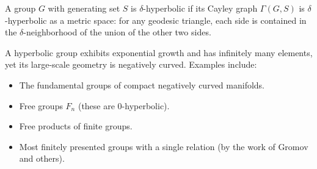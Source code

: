 A group $G$ with generating set $S$ is $\delta$-hyperbolic if its Cayley graph $\Gamma(G,S)$ is $\delta$-hyperbolic as a metric space: for any geodesic triangle, each side is contained in the $\delta$-neighborhood of the union of the other two sides.

A hyperbolic group exhibits exponential growth and has infinitely many elements, yet its large-scale geometry is negatively curved. Examples include:
\begin{itemize}
\item The fundamental groups of compact negatively curved manifolds.
\item Free groups $F_n$ (these are 0-hyperbolic).
\item Free products of finite groups.
\item Most finitely presented groups with a single relation (by the work of Gromov and others).
\end{itemize}

